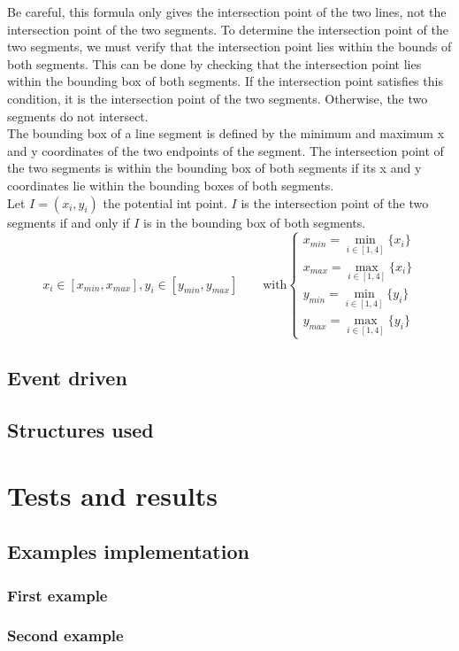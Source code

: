 \documentclass[10pt,a4paper,hidelinks]{article}
\begin{document}
Be careful, this formula only gives the intersection point of the two lines, not the intersection point of the two segments. To determine the intersection point of the two segments, we must verify that the intersection point lies within the bounds of both segments. This can be done by checking that the intersection point lies within the bounding box of both segments. If the intersection point satisfies this condition, it is the intersection point of the two segments. Otherwise, the two segments do not intersect.\\
The bounding box of a line segment is defined by the minimum and maximum x and y coordinates of the two endpoints of the segment. The intersection point of the two segments is within the bounding box of both segments if its x and y coordinates lie within the bounding boxes of both segments.\\

Let $I=(x_i, y_i)$ the potential int point. $I$ is the intersection point of the two segments if and only if $I$ is in the bounding box of both segments.
$$x_i \in [x_{min}, x_{max}], y_i \in [y_{min}, y_{max}]\qquad \text{with}
\left\lbrace\begin{array}{l}
x_{min} = \min_{i\in[1, 4]}\{x_i\}\\
x_{max} = \max_{i\in[1, 4]}\{x_i\}\\
y_{min} = \min_{i\in[1, 4]}\{y_i\}\\
y_{max} = \max_{i\in[1, 4]}\{y_i\}
\end{array}\right.$$

\subsection{Event driven}
\subsection{Structures used}

\section{Tests and results}
\subsection{Examples implementation}
\subsubsection{First example}
\subsubsection{Second example}
\end{document}
